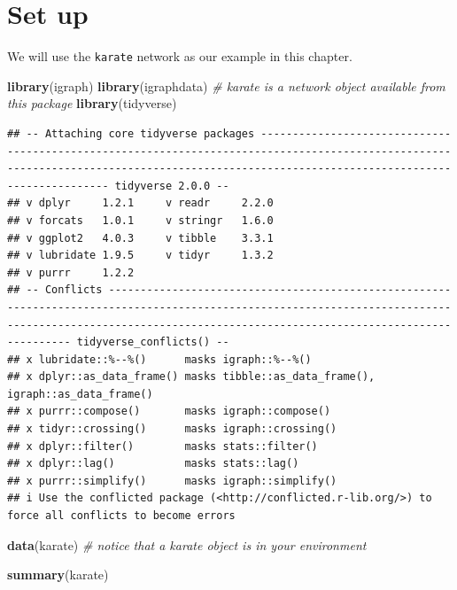 \documentclass[
]{book}
\newenvironment{Shaded}{\begin{snugshade}}{\end{snugshade}}
\newcommand{\CommentTok}[1]{\textcolor[rgb]{0.56,0.35,0.01}{\textit{#1}}}
\newcommand{\FunctionTok}[1]{\textcolor[rgb]{0.13,0.29,0.53}{\textbf{#1}}}
\newcommand{\NormalTok}[1]{#1}
\newcommand{\StringTok}[1]{\textcolor[rgb]{0.31,0.60,0.02}{#1}}
\begin{document}
\section{Set up}\label{set-up}

We will use the \texttt{karate} network as our example in this chapter.

\begin{Shaded}
\begin{Highlighting}[]
\FunctionTok{library}\NormalTok{(igraph)}
\FunctionTok{library}\NormalTok{(igraphdata) }\CommentTok{\# karate is a network object available from this package}
\FunctionTok{library}\NormalTok{(tidyverse)}
\end{Highlighting}
\end{Shaded}

\begin{verbatim}
## -- Attaching core tidyverse packages ------------------------------------------------------------------------------------------------------------------------------------------------------------------------------------------ tidyverse 2.0.0 --
## v dplyr     1.2.1     v readr     2.2.0
## v forcats   1.0.1     v stringr   1.6.0
## v ggplot2   4.0.3     v tibble    3.3.1
## v lubridate 1.9.5     v tidyr     1.3.2
## v purrr     1.2.2     
## -- Conflicts ------------------------------------------------------------------------------------------------------------------------------------------------------------------------------------------------------------ tidyverse_conflicts() --
## x lubridate::%--%()      masks igraph::%--%()
## x dplyr::as_data_frame() masks tibble::as_data_frame(), igraph::as_data_frame()
## x purrr::compose()       masks igraph::compose()
## x tidyr::crossing()      masks igraph::crossing()
## x dplyr::filter()        masks stats::filter()
## x dplyr::lag()           masks stats::lag()
## x purrr::simplify()      masks igraph::simplify()
## i Use the conflicted package (<http://conflicted.r-lib.org/>) to force all conflicts to become errors
\end{verbatim}

\begin{Shaded}
\begin{Highlighting}[]
\FunctionTok{data}\NormalTok{(}\StringTok{\textquotesingle{}karate\textquotesingle{}}\NormalTok{) }\CommentTok{\# notice that a karate object is in your environment }

\FunctionTok{summary}\NormalTok{(karate)}
\end{Highlighting}
\end{Shaded}
\end{document}
